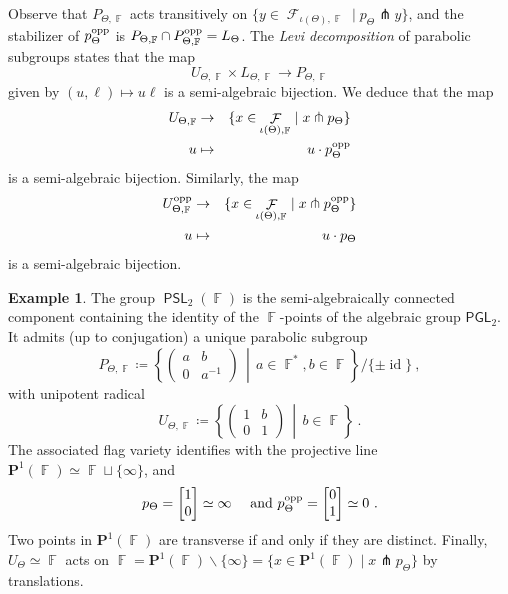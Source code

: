 \documentclass{amsart}
\theoremstyle{plain}
\theoremstyle{definition}
\newtheorem{example}[proposition]{Example}
\DeclareMathOperator{\PSL}{\mathsf{PSL}}
\DeclareMathOperator{\id}{id}
\DeclareMathOperator{\Fc}{\mathcal{F}}
\DeclareMathOperator{\Fb}{{\mathbb{F}}}
\newcommand{\opp}{\textnormal{opp}}
\newcommand{\1}{\mathbf{1}}
\begin{document}
Observe that  $P_{\Theta,\Fb}$ acts transitively on $\{y\in \Fc_{\iota(\Theta),\Fb} \mid p_\Theta \pitchfork y\}$, and the stabilizer of $p_{\Theta}^\opp$ is $P_{\Theta,\Fb} \cap P_{\Theta,\Fb}^\opp = L_\Theta$. 
The \emph{Levi decomposition} of parabolic subgroups states that the map
\[U_{\Theta,\Fb}\times L_{\Theta,\Fb}\to P_{\Theta,\Fb}\]
given by $(u,\ell)\mapsto u\ell$ is a semi-algebraic  bijection. We deduce that the map
\begin{eqnarray*}
U_{\Theta,\Fb}& \to &\{x\in\Fc_{\iota(\Theta),\Fb} \mid x\pitchfork p_\Theta\}\\
u & \mapsto & u \cdot p_\Theta^\opp
\end{eqnarray*}
is a semi-algebraic bijection. Similarly, the map 
\begin{eqnarray*}
U_{\Theta,\Fb}^\opp& \to &\{x\in\Fc_{\iota(\Theta),\Fb} \mid x\pitchfork p_\Theta^\opp\}\\
u & \mapsto & u \cdot p_\Theta
\end{eqnarray*}
is a semi-algebraic bijection.


\begin{example}
    The group $\PSL_2(\Fb)$ is the semi-algebraically connected component containing the identity of the $\Fb$-points of the algebraic group $\mathsf{PGL}_2$. It admits (up to conjugation) a unique parabolic subgroup
    \[P_{\Theta,\Fb} \coloneqq \left\{\left( \begin{matrix} a & b \\ 0 & a^{-1}\end{matrix}\right)\,\middle\vert \, a\in \Fb^*, b\in \Fb\right\}/\{\pm \id\}~,\]
    with unipotent radical 
    \[U_{\Theta,\Fb} \coloneqq \left\{\begin{pmatrix} 1 & b \\ 0 & 1\end{pmatrix} \, \middle\vert \, b\in \Fb\right\}~.\]
    The associated flag variety identifies with the projective line $\mathbf{P}^1(\Fb) \simeq \Fb \sqcup \{\infty\}$, and 
    \[p_\Theta = \left[ \begin{matrix} 1\\0 \end{matrix}\right] \simeq \infty \quad \textrm{ and }  p_\Theta^\opp = \left[ \begin{matrix} 0\\1 \end{matrix}\right] \simeq 0~.\]
    Two points in $\mathbf{P}^1(\Fb)$ are transverse if and only if they are distinct. Finally, $U_\Theta\simeq \Fb$ acts on $\Fb = \mathbf{P}^1(\Fb) \backslash \{\infty\} = \{x\in \mathbf{P}^1(\Fb) \mid x \pitchfork p_\Theta\}$ by translations.
\end{example}
\end{document}
